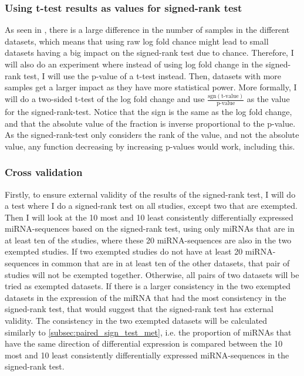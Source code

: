 \subsubsection{Using t-test results as values for signed-rank test}
\label{subsubsec:met_t_test_signed_rank}
As seen in \citet{forprosjekt}, there is a large difference in the number of samples in the different datasets, which means that using raw log fold chance might lead to small datasets having a big impact on the signed-rank test due to chance. Therefore, I will also do an experiment where instead of using log fold change in the signed-rank test, I will use the p-value of a t-test instead. Then, datasets with more samples get a larger impact as they have more statistical power. More formally, I will do a two-sided t-test of the log fold change and use $\frac{\text{sgn}(\text{t-value})}{\text{p-value}}$ as the value for the signed-rank-test. Notice that the sign is the same as the log fold change, and that the absolute value of the fraction is inverse proportional to the p-value. As the signed-rank-test only considers the rank of the value, and not the absolute value, any function decreasing by increasing p-values would work, including this.



\subsubsection{Cross validation}
\label{subsubsec:met_signed_rank_cv}
Firstly, to ensure external validity of the results of the signed-rank test, I will do a test where I do a signed-rank test on all studies, except two that are exempted. Then I will look at the 10 most and 10 least consistently differentially expressed miRNA-sequences based on the signed-rank test, using only miRNAs that are in at least ten of the studies, where these 20 miRNA-sequences are also in the two exempted studies. If two exempted studies do not have at least 20 miRNA-sequences in common that are in at least ten of the other datasets, that pair of studies will not be exempted together. Otherwise, all pairs of two datasets will be tried as exempted datasets. If there is a larger consistency in the two exempted datasets in the expression of the miRNA that had the most consistency in the signed-rank test, that would suggest that the signed-rank test has external validity. The consistency in the two exempted datasets will be calculated similarly to \autoref{subsec:paired_sign_test_met}, i.e. the proportion of miRNAs that have the same direction of differential expression is compared between the 10 most and 10 least consistently differentially expressed miRNA-sequences in the signed-rank test. 

